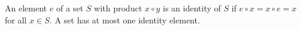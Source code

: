 An element $e$ of a set $S$ with product $x \circ y$ is an identity of $S$ if $e \circ x = x \circ e = x$ for all $x \in S$. A set has at most one identity element.
